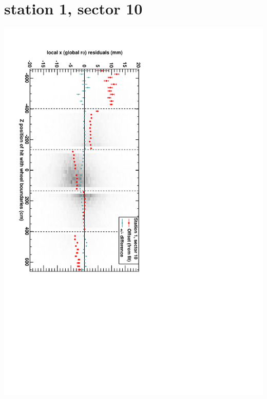 \documentclass[compress]{beamer}
\begin{document}
\section*{station 1, sector 10}
\begin{frame} \vfill \mbox{\hspace{-1 cm}\includegraphics[height=1.2\linewidth, angle=90]{DTrphiVsZ_st1_sr10.pdf}} \end{frame}
\end{document}
